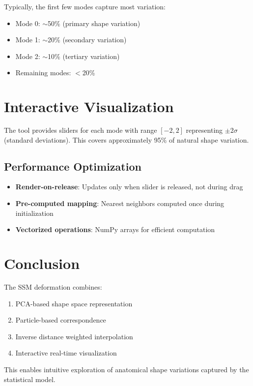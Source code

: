 \documentclass[12pt,a4paper]{article}
\begin{document}
Typically, the first few modes capture most variation:
\begin{itemize}
    \item Mode 0: $\sim$50\% (primary shape variation)
    \item Mode 1: $\sim$20\% (secondary variation)
    \item Mode 2: $\sim$10\% (tertiary variation)
    \item Remaining modes: $<$20\%
\end{itemize}

\section{Interactive Visualization}

The tool provides sliders for each mode with range $[-2, 2]$ representing $\pm 2\sigma$ (standard deviations). This covers approximately 95\% of natural shape variation.

\subsection{Performance Optimization}

\begin{itemize}
    \item \textbf{Render-on-release}: Updates only when slider is released, not during drag
    \item \textbf{Pre-computed mapping}: Nearest neighbors computed once during initialization
    \item \textbf{Vectorized operations}: NumPy arrays for efficient computation
\end{itemize}

\section{Conclusion}

The SSM deformation combines:
\begin{enumerate}
    \item PCA-based shape space representation
    \item Particle-based correspondence
    \item Inverse distance weighted interpolation
    \item Interactive real-time visualization
\end{enumerate}

This enables intuitive exploration of anatomical shape variations captured by the statistical model.
\end{document}
